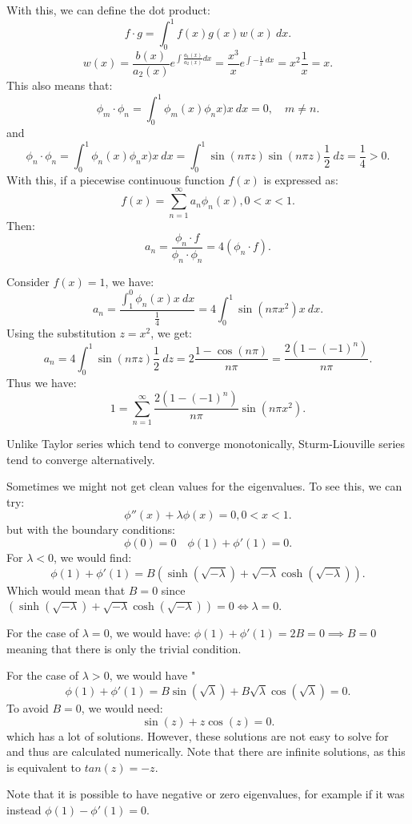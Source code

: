 \documentclass[../main/main.tex]{subfiles}
\begin{document}
With this, we can define the dot product: \[
	f\cdot g = \int^1_0 f(x) g(x) w(x) ~dx
.\] \[
w(x) = \frac{b(x)}{a_2(x)}e^{\int \frac{a_1(x)}{a_2(x)}dx} = \frac{x^{3}}{x}e^{\int- \frac{1}{x}~dx} = x^2 \frac{1}{x} = x
.\] This also means that: \[
\phi_m \cdot  \phi_n = \int^1_0 \phi_m(x) \phi_nx) x ~dx = 0, \quad m\neq n
.\] and \[ 
\phi_n \cdot  \phi_n = \int^1_0 \phi_n(x) \phi_nx) x ~dx = \int^1_0 \sin(n \pi z) \sin (n \pi z) \frac{1}{2} ~dz = \frac{1}{4} >0
.\] 
With this, if a piecewise continuous function $f(x)$ is expressed as: \[
	f(x) = \sum_{n=1}^{\infty} a_n \phi_n(x) , 0 < x < 1
.\] Then: \[
a_n = \frac{\phi_n \cdot  f}{\phi_n\cdot \phi_n}  = 4(\phi_n \cdot  f)
.\] 
\begin{example}
	Consider $f(x) = 1$, we have:  \[
		a_n = \frac{\int^0_1 \phi_n(x) x ~dx}{\frac{1}{4}} = 4\int^1_0 \sin(n \pi x^2) x ~dx 
	.\] Using the substitution $z = x^2$, we get: \[
	a_n = 4 \int^1_0 \sin(n\pi z) \frac{1}{2} ~dz = 2 \frac{1-\cos(n\pi)}{n\pi} = \frac{2(1-(-1)^{n})}{n\pi} 
	.\] Thus we have: \[
	1 = \sum_{n=1}^{\infty} \frac{2(1-(-1)^n)}{n\pi}\sin(n\pi x^2)
	.\] 
\end{example}
\begin{remark}
	Unlike Taylor series which tend to converge monotonically, Sturm-Liouville series tend to converge alternatively.
\end{remark}
Sometimes we might not get clean values for the eigenvalues. To see this, we can try:  \[
	\phi''(x) + \lambda \phi(x) = 0 , 0 < x < 1
.\] but with the boundary conditions: \[
\phi(0) = 0\quad \phi(1) + \phi'(1) = 0
.\] For $\lambda<0$, we would find:  \[
\phi(1) + \phi'(1) = B \left( \sinh (\sqrt{-\lambda} )+\sqrt{-\lambda} \cosh(\sqrt{-\lambda}     ) \right) 
.\] Which would mean that  $B=0$  since $\left( \sinh (\sqrt{-\lambda} )+\sqrt{-\lambda} \cosh(\sqrt{-\lambda}     ) \right)=0 \iff \lambda = 0$.

For the case of $\lambda=0$, we would have: $\phi(1) + \phi'(1) = 2B = 0 \implies B = 0$ meaning that there is only the trivial condition.

For the case of $\lambda>0$, we would have " \[
	\phi(1) + \phi'(1) = B \sin(\sqrt{\lambda} ) +  B \sqrt{\lambda} \cos(\sqrt{\lambda} ) = 0
.\] To avoid $B=0$, we would need: \[
\sin(z)+ z\cos(z)= 0
.\] which has a lot of solutions. However, these solutions are not easy to solve for and thus are calculated numerically. Note that there are infinite solutions, as this is equivalent to $tan(z) = -z$.
\begin{remark}
	Note that it is possible to have negative or zero eigenvalues, for example if it was instead $\phi(1) - \phi'(1) = 0$.
\end{remark}
\end{document}
